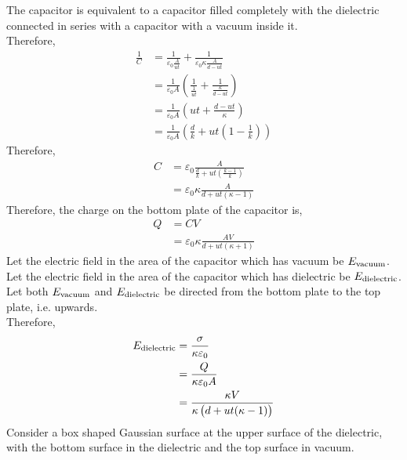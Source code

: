 \documentclass[fleqn, a4paper, 8pt, twoside]{amsart}
\theoremstyle{definition}
\theoremstyle{theorem}
\begin{document}
\begin{multicols}{2}
\begin{spacing}{0.6}
\begin{solution}
	The capacitor is equivalent to a capacitor filled completely with the dielectric connected in series with a capacitor with a vacuum inside it.\\
	Therefore,
	\begin{align*}
		\frac{1}{C} & = \frac{1}{\varepsilon_0 \frac{A}{u t}} + \frac{1}{\varepsilon_0 \kappa \frac{A}{d - u t}}            \\
                            & = \frac{1}{\varepsilon_0 A} \left( \frac{1}{\frac{1}{u t}} + \frac{1}{\frac{\kappa}{d - u t}} \right) \\
                            & = \frac{1}{\varepsilon_0 A} \left( u t + \frac{d - u t}{\kappa} \right)                               \\
                            & = \frac{1}{\varepsilon_0 A} \left( \frac{d}{k} + u t \left( 1 - \frac{1}{k} \right) \right)
	\end{align*}
	Therefore,
	\begin{align*}
		C & = \varepsilon_0 \frac{A}{\frac{d}{k} + u t \left( \frac{k - 1}{k} \right)} \\
                  & = \varepsilon_0 \kappa \frac{A}{d + u t (\kappa - 1)}
	\end{align*}
	Therefore, the charge on the bottom plate of the capacitor is,
	\begin{align*}
		Q & = C V \\
                  & = \varepsilon_0 \kappa \frac{A V}{d + u t (\kappa + 1)}
	\end{align*}
	Let the electric field in the area of the capacitor which has vacuum be $E_{\textnormal{vacuum}}$.\\
	Let the electric field in the area of the capacitor which has dielectric be $E_{\textnormal{dielectric}}$.\\
	Let both $E_{\textnormal{vacuum}}$ and $E_{\textnormal{dielectric}}$ be directed from the bottom plate to the top plate, i.e. upwards.\\
	Therefore,
	\begin{align*}
		E_{\textnormal{dielectric}} & = \frac{\sigma}{\kappa \varepsilon_0} \\
                                            & = \frac{Q}{\kappa \varepsilon_0 A}    \\
                                            & = \frac{\kappa V}{\kappa \left( d + u t (\kappa - 1) \right)}
	\end{align*}
	Consider a box shaped Gaussian surface at the upper surface of the dielectric, with the bottom surface in the dielectric and the top surface in vacuum.\\

\end{solution}
\end{spacing}
\end{multicols}
\end{document}
